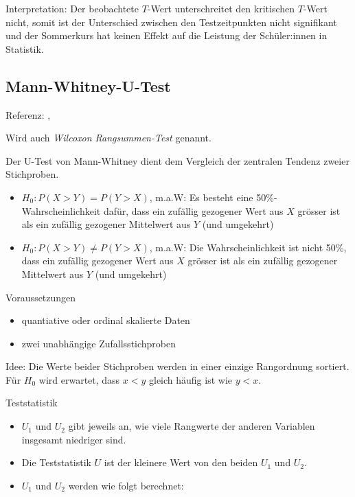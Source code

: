 \documentclass[
]{book}
\providecommand{\tightlist}{%
  \setlength{\itemsep}{0pt}\setlength{\parskip}{0pt}}
\begin{document}
Interpretation: Der beobachtete \(T\)-Wert unterschreitet den kritischen \(T\)-Wert nicht, somit ist der Unterschied zwischen den Testzeitpunkten nicht signifikant und der Sommerkurs hat keinen Effekt auf die Leistung der Schüler:innen in Statistik.

\hypertarget{mann-whitney-u-test}{%
\subsection{Mann-Whitney-U-Test}\label{mann-whitney-u-test}}

Referenz: \citet{King2019}, \citet{Leonhart2013}

Wird auch \emph{Wilcoxon Rangsummen-Test} genannt.

Der U-Test von Mann-Whitney dient dem Vergleich der zentralen Tendenz zweier Stichproben.

\begin{itemize}
\tightlist
\item
  \(H_0: P(X > Y) = P(Y > X)\), m.a.W: Es besteht eine 50\%-Wahrscheinlichkeit dafür, dass ein zufällig gezogener Wert aus \(X\) grösser ist als ein zufällig gezogener Mittelwert aus \(Y\) (und umgekehrt)\\
\item
  \(H_0: P(X > Y) \neq P(Y > X)\), m.a.W: Die Wahrscheinlichkeit ist nicht 50\%, dass ein zufällig gezogener Wert aus \(X\) grösser ist als ein zufällig gezogener Mittelwert aus \(Y\) (und umgekehrt)
\end{itemize}

Voraussetzungen

\begin{itemize}
\tightlist
\item
  quantiative oder ordinal skalierte Daten\\
\item
  zwei unabhängige Zufallsstichproben
\end{itemize}

Idee: Die Werte beider Stichproben werden in einer einzige Rangordnung sortiert. Für \(H_0\) wird erwartet, dass \(x < y\) gleich häufig ist wie \(y < x\).

Teststatistik

\begin{itemize}
\tightlist
\item
  \(U_1\) und \(U_2\) gibt jeweils an, wie viele Rangwerte der anderen Variablen insgesamt niedriger sind.
\item
  Die Teststatistik \(U\) ist der kleinere Wert von den beiden \(U_1\) und \(U_2\).
\item
  \(U_1\) und \(U_2\) werden wie folgt berechnet:
\end{itemize}
\end{document}
